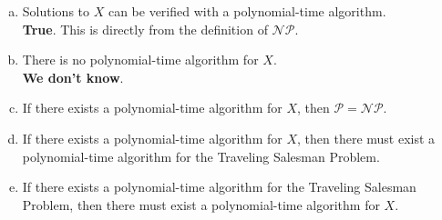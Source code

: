 \documentclass{scrartcl}
\begin{document}
\begin{flushleft}
    \begin{enumerate}[(a)]
        \item Solutions to $X$ can be verified with a polynomial-time algorithm.\\
            \medskip
            \textbf{True}. This is directly from the definition of $\mathcal{NP}$.
        \item There is no polynomial-time algorithm for $X$.\\
            \medskip
            \textbf{We don't know}.
        \item If there exists a polynomial-time algorithm for $X$, then $\mathcal{P} =
            \mathcal{NP}$.
        \item If there exists a polynomial-time algorithm for $X$, then there must exist a
            polynomial-time algorithm for the Traveling Salesman Problem.
        \item If there exists a polynomial-time algorithm for the Traveling Salesman Problem, then
            there must exist a polynomial-time algorithm for $X$.
    \end{enumerate}

    
    
\end{flushleft}
\end{document}

